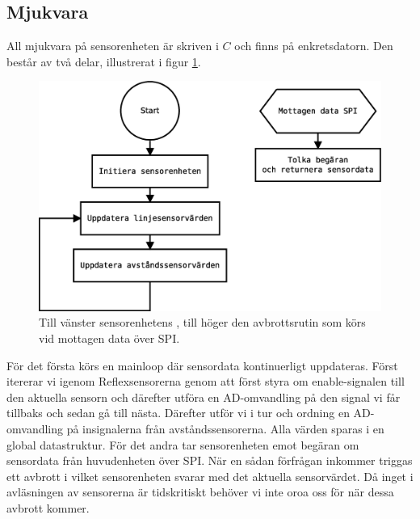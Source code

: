 \subsection{Mjukvara}

All mjukvara på sensorenheten är skriven i $C$ och finns på enkretsdatorn. Den består av två delar, illustrerat i figur \ref{sensorenhet-mjukvara}.

\begin{figure}[h!]
	\centering
	\includegraphics[scale=0.4]{grafik/sensorenhet-mjukvara}
	\caption{Till vänster sensorenhetens , till höger den avbrottsrutin som körs vid mottagen data över SPI.} \label{sensorenhet-mjukvara}
\end{figure}

För det första körs en mainloop där sensordata kontinuerligt uppdateras. Först itererar vi igenom Reflexsensorerna genom att först styra om enable-signalen till den aktuella sensorn och därefter utföra en AD-omvandling på den signal vi får tillbaks och sedan gå till nästa. Därefter utför vi i tur och ordning en AD-omvandling på insignalerna från avståndssensorerna. Alla värden sparas i en global datastruktur.
\newline
För det andra tar sensorenheten emot begäran om sensordata från huvudenheten över SPI. När en sådan förfrågan inkommer triggas ett avbrott i vilket sensorenheten svarar med det aktuella sensorvärdet. Då inget i avläsningen av sensorerna är tidskritiskt behöver vi inte oroa oss för när dessa avbrott kommer.
